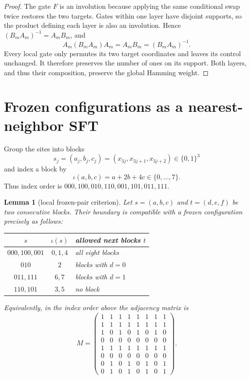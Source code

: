 \documentclass[11pt,a4paper]{amsart}
\newtheorem{lemma}[theorem]{Lemma}
\theoremstyle{definition}
\theoremstyle{remark}
\begin{document}
\begin{proof}
The gate $F$ is an involution because applying the same conditional swap
twice restores the two targets.  Gates within one layer have disjoint
supports, so the product defining each layer is also an involution.  Hence
$(B_mA_m)^{-1}=A_mB_m$, and
\[
 A_m(B_mA_m)A_m=A_mB_m=(B_mA_m)^{-1}.
\]
Every local gate only permutes its two target coordinates and leaves its
control unchanged.  It therefore preserves the number of ones on its support.
Both layers, and thus their composition, preserve the global Hamming weight.
\end{proof}

\section{Frozen configurations as a nearest-neighbor SFT}

Group the sites into blocks
\[
 s_j=(a_j,b_j,c_j)=(x_{3j},x_{3j+1},x_{3j+2})\in\{0,1\}^3
\]
and index a block by
\[
 \iota(a,b,c)=a+2b+4c\in\{0,\ldots,7\}.
\]
Thus index order is $000,100,010,110,001,101,011,111$.

\begin{lemma}[local frozen-pair criterion]\label{lem:local}
Let $s=(a,b,c)$ and $t=(d,e,f)$ be two consecutive blocks.  Their boundary
is compatible with a frozen configuration precisely as follows:
\begin{center}
\begin{tabular}{ccl}
\toprule
$s$ & $\iota(s)$ & allowed next blocks $t$ \\
\midrule
$000,100,001$ & $0,1,4$ & all eight blocks \\
$010$         & $2$     & blocks with $d=0$ \\
$011,111$     & $6,7$   & blocks with $d=1$ \\
$110,101$     & $3,5$   & no block \\
\bottomrule
\end{tabular}
\end{center}
Equivalently, in the index order above the adjacency matrix is
\begin{equation}\label{eq:M}
M=
\begin{pmatrix}
1&1&1&1&1&1&1&1\\
1&1&1&1&1&1&1&1\\
1&0&1&0&1&0&1&0\\
0&0&0&0&0&0&0&0\\
1&1&1&1&1&1&1&1\\
0&0&0&0&0&0&0&0\\
0&1&0&1&0&1&0&1\\
0&1&0&1&0&1&0&1
\end{pmatrix}.
\end{equation}
\end{lemma}
\end{document}
